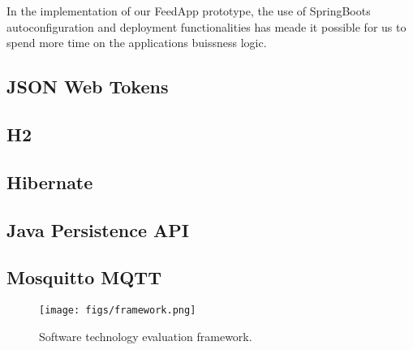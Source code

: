 In the implementation of our FeedApp prototype, the use of SpringBoots autoconfiguration and deployment functionalities has meade it possible for us to spend more time on the applications buissness logic. 

\subsection{JSON Web Tokens} 

\subsection{H2} 

\subsection{Hibernate} 

\subsection{Java Persistence API} 

\subsection{Mosquitto MQTT}

\begin{figure}
  \centering
  \texttt{[image: figs/framework.png]}
  \caption{Software technology evaluation framework.}
  \label{fig:framework}
\end{figure}
